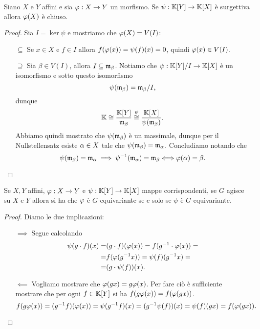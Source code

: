 \begin{proposition}\label{PrImmagineChiusaSeTraAlgebraSurgettiva}
Siano $X$ e $Y$ affini e sia $\varphi:X\to Y$ un morfismo. Se $\psi:\mathbb{K}[Y]\to \mathbb{K}[X]$ \`e surgettiva allora $\varphi(X)$ \`e chiuso.
\end{proposition}
\begin{proof}
Sia $I=\ker\psi$ e mostriamo che $\varphi(X)=V(I)$:
\setlength{\leftmargini}{0cm}
\begin{itemize}
\item[$\boxed{\subseteq}$] Se $x\in X$ e $f\in I$ allora $f(\varphi(x))=\psi(f)(x)=0$, quindi $\varphi(x)\in V(I)$.
\item[$\boxed{\supseteq}$] Sia $\beta\in V(I)$, allora $I\subseteq \mathfrak{m}_\beta$. Notiamo che $\psi:\mathbb{K}[Y]/I\to \mathbb{K}[X]$ \`e un isomorfismo e sotto questo isomorfismo
\[\psi(\mathfrak{m}_\beta)=\mathfrak{m}_\beta/I,\]
dunque
\[\mathbb{K}\cong \frac{\mathbb{K}[Y]}{\mathfrak{m}_\beta}\overset\psi\cong\frac{\mathbb{K}[X]}{\psi(\mathfrak{m}_\beta)}.\]
Abbiamo quindi mostrato che $\psi(\mathfrak{m}_\beta)$ \`e un massimale, dunque per il Nullstellensatz esiste $\alpha\in X$ tale che $\psi(\mathfrak{m}_\beta)=\mathfrak{m}_\alpha$. Concludiamo notando che
\[\psi(\mathfrak{m}_\beta)=\mathfrak{m}_\alpha\implies \psi^{-1}(\mathfrak{m}_\alpha)=\mathfrak{m}_\beta\Longleftrightarrow \varphi(\alpha)=\beta.\]
\end{itemize}
\setlength{\leftmargini}{0.5cm}
\end{proof}

\begin{proposition}\label{PrMappaTraAffiniGequivarianteSSeMappaTraAlgebreGEquivariante}
Se $X,Y$ affini, $\varphi:X\to Y$ e $\psi:\mathbb{K}[Y]\to \mathbb{K}[X]$ mappe corrispondenti, se $G$ agisce su $X$ e $Y$ allora si ha che $\varphi$ \`e $G$-equivariante se e solo se $\psi$ \`e $G$-equivariante.
\end{proposition}
\begin{proof}
Diamo le due implicazioni:
\setlength{\leftmargini}{0cm}
\begin{itemize}
\item[$\boxed{\implies}$] Segue calcolando
\begin{align*}
\psi(g\cdot f)(x)=& (g\cdot f)(\varphi(x))= f(g^{-1}\cdot \varphi(x))=\\
=&f(\varphi(g^{-1} x))=\psi(f)(g^{-1} x)=\\
=&(g\cdot \psi(f))(x).
\end{align*}
\item[$\boxed{\impliedby}$] Vogliamo mostrare che $\varphi(gx)=g\varphi(x)$. Per fare ci\`o \`e sufficiente mostrare che per ogni $f\in\mathbb{K}[Y]$ si ha $f(g\varphi(x))=f(\varphi(gx))$.
\[f(g\varphi(x))=(g^{-1} f)(\varphi(x))=\psi(g^{-1} f)(x)=(g^{-1}\psi(f))(x)=\psi(f)(gx)=f(\varphi(gx)).\]
\end{itemize}
\setlength{\leftmargini}{0.5cm}
\end{proof}


